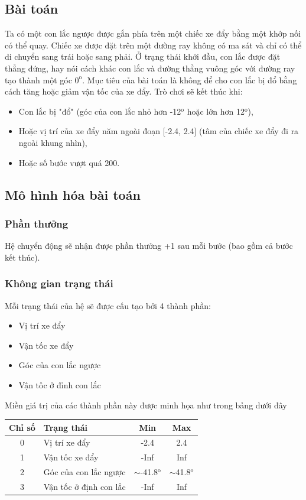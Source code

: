 \documentclass[12pt,a4paper]{report}
\begin{document}
\subsection{Bài toán}
Ta có một con lắc ngược được gắn phía trên một chiếc xe đẩy bằng một khớp nối có thể
quay. Chiếc xe được đặt trên một đường ray không có ma sát và chỉ có thể di chuyển sang
trái hoặc sang phải. Ở trạng thái khởi đầu, con lắc được đặt thẳng đứng, hay nói cách khác
con lắc và đường thẳng vuông góc với đường ray tạo thành một góc $0^\text{o}$. Mục tiêu của bài toán
là không để cho con lắc bị đổ bằng cách tăng hoặc giảm vận tốc của xe đẩy. Trò chơi sẽ kết
thúc khi:
\begin{itemize}
	\item Con lắc bị "đổ" (góc của con lắc nhỏ hơn -12$^\text{o}$ hoặc lớn hơn 12$^\text{o}$),
	\item Hoặc vị trí của xe đẩy năm ngoài đoạn [-2.4, 2.4] (tâm của chiếc xe đẩy đi ra ngoài
	khung nhìn),
	\item Hoặc số bước vượt quá 200.
\end{itemize}
\subsection{Mô hình hóa bài toán}
\subsubsection{Phần thưởng}
Hệ chuyển động sẽ nhận được phần thưởng +1 sau mỗi bước (bao gồm cả bước kết thúc).
\subsubsection{Không gian trạng thái}
Mỗi trạng thái của hệ sẽ được cấu tạo bởi 4 thành phần:
\begin{itemize}
	\item Vị trí xe đẩy
	\item Vận tốc xe đẩy
	\item Góc của con lắc ngược
	\item Vận tốc ở đỉnh con lắc
\end{itemize}
Miền giá trị của các thành phần này được minh họa như trong bảng dưới đây
\begin{center}
	\begin{tabular}{|c|l|c|c|}
		\hline
		\textbf{Chỉ số} & \textbf{Trạng thái} & \textbf{Min} & \textbf{Max} \\
		\hline
		0 & Vị trí xe đẩy & -2.4 & 2.4 \\
		\hline
		1 & Vận tốc xe đẩy & -Inf & Inf \\
		\hline
		2 & Góc của con lắc ngược & $\sim$-41.8$^\text{o}$ & $\sim$41.8$^\text{o}$ \\
		\hline
		3 & Vận tốc ở định con lắc & -Inf & Inf \\
		\hline
	\end{tabular}
\end{center}
\end{document}
